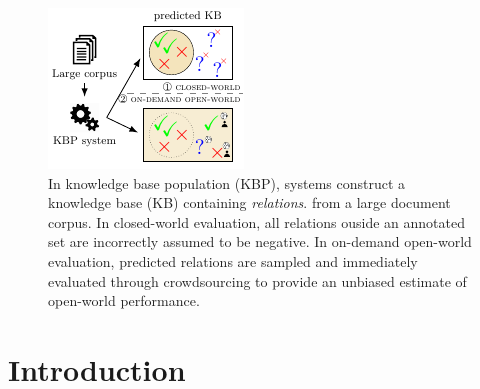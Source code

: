 \begin{figure}[t]
  \includegraphics[width=\columnwidth]{figures/overview}
  \caption{\label{fig:overview}
  In knowledge base population (KBP), systems construct a knowledge base (KB) containing \textit{relations}. %
  from a large document corpus.
  In closed-world evaluation, %
  all relations ouside an annotated set are incorrectly assumed to be negative.
  In on-demand open-world evaluation,
  predicted relations are sampled and immediately evaluated through crowdsourcing
  to provide an unbiased estimate of open-world performance. %
  }
\end{figure}

\section{Introduction}
\label{sec:intro}


